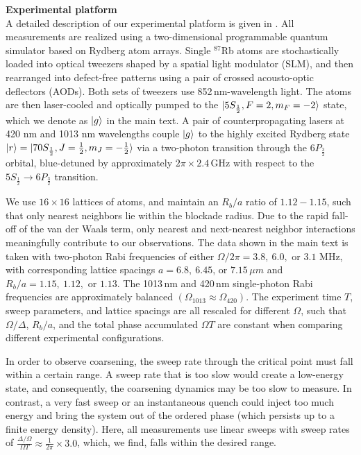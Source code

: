 \documentclass[reprint,twocolumn,secnumarabic,amssymb, aps, prx]{revtex4-2}
\begin{document}
\noindent\textbf{Experimental platform}\\
A detailed description of our experimental platform is given in \cite{ebadi2021quantum, bluvstein2024logical}. All measurements are realized using a two-dimensional programmable quantum simulator based on Rydberg atom arrays. Single $^{87}$Rb atoms are stochastically loaded into optical tweezers shaped by a spatial light modulator (SLM), and then rearranged into defect-free patterns using a pair of crossed acousto-optic deflectors (AODs). Both sets of tweezers use 852\,nm-wavelength light. The atoms are then laser-cooled and optically pumped to the $\ket{5S_{\frac{1}{2}},F=2,m_F=-2}$ state, which we denote as $\ket{g}$ in the main text. A pair of counterpropagating lasers at 420 nm and 1013 nm wavelengths couple $\ket{g}$ to the highly excited Rydberg state $\ket{r} = \ket{70S_{\frac{1}{2}},J=\frac{1}{2},m_{J}=-\frac{1}{2}}$ via a two-photon transition through the $6P_{\frac{3}{2}}$ orbital, blue-detuned by approximately $2\pi\times 2.4$\,GHz with respect to the $5S_{\frac{1}{2}}\rightarrow6P_{\frac{3}{2}}$ transition.

We use $16\times 16$ lattices of atoms, and maintain an $R_b/a$ ratio of $1.12-1.15$, such that only nearest neighbors lie within the blockade radius. Due to the rapid fall-off of the van der Waals term, only nearest and next-nearest neighbor interactions meaningfully contribute to our observations. The data shown in the main text is taken with two-photon Rabi frequencies of either $\Omega/2\pi=3.8,~6.0,$ or $3.1$ MHz, with corresponding lattice spacings $a = 6.8,~6.45 $, or $ 7.15$\,$\mu m$ and $R_b/a = 1.15,~1.12,$ or $1.13$. The 1013\,nm and 420\,nm single-photon Rabi frequencies are approximately balanced $(\Omega_{1013}\approx\Omega_{420})$. The experiment time $T$, sweep parameters, and lattice spacings are all rescaled for different $\Omega$, such that $\Omega/\Delta$, $R_b/a$, and the total phase accumulated $\Omega T$ are constant when comparing different experimental configurations.

In order to observe coarsening, the sweep rate through the critical point must fall within a certain range. A sweep rate that is too slow  would create a low-energy state, and consequently, the coarsening dynamics may be too slow to measure. In contrast, a very fast sweep  or an instantaneous quench could inject too much energy and bring the system out of the ordered phase (which persists up to a finite energy density). Here, all measurements use linear sweeps with sweep rates of $\frac{\Delta/\Omega}{\Omega T}\approx\frac{1}{2\pi}\times 3.0$, which, we find, falls within the desired range.
\end{document}
